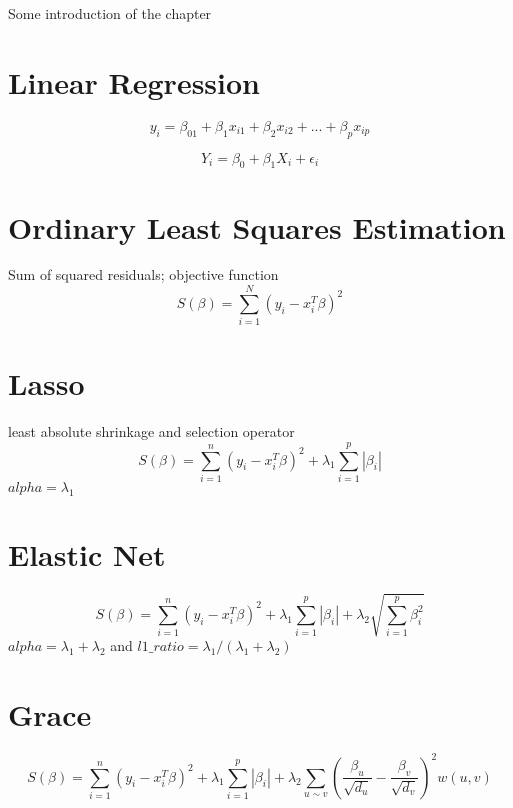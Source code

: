 Some introduction of the chapter


\section{Linear Regression}
\begin{equation}
y_i = \beta_01+\beta_1x_{i1}+\beta_2x_{i2}+...+\beta_px_{ip}
\end{equation}

\begin{equation}
Y_i = \beta_0 + \beta_1 X_i + \epsilon_i
\end{equation}


\section{Ordinary Least Squares Estimation}
Sum of squared residuals; objective function
\begin{equation}
S(\beta) = \sum_{i=1}^{N} (y_i - x_i^T\beta)^2
\end{equation}


\section{Lasso}
least absolute shrinkage and selection operator
\begin{equation}
S(\beta) = \sum_{i=1}^{n} (y_i - x_i^T\beta)^2 + \lambda_1\sum_{i=1}^{p}\left|\beta_i\right|
\end{equation}
$alpha = \lambda_1$


\section{Elastic Net}
\begin{equation}
S(\beta) = \sum_{i=1}^{n} (y_i - x_i^T\beta)^2 + \lambda_1\sum_{i=1}^{p}\left|\beta_i\right| + \lambda_2\sqrt{\sum_{i=1}^{p}\beta_i^2}
\end{equation}
$alpha = \lambda_1 + \lambda_2$ and $l1\_ratio = \lambda_1/(\lambda_1+\lambda_2)$


\section{Grace}
\begin{equation}
S(\beta) = \sum_{i=1}^{n} (y_i - x_i^T\beta)^2 + \lambda_1\sum_{i=1}^{p}\left|\beta_i\right| + \lambda_2\sum_{u \sim v}\left(\frac{\beta_u}{\sqrt{d_u}}-\frac{\beta_v}{\sqrt{d_v}}\right)^2w(u,v)
\end{equation}



